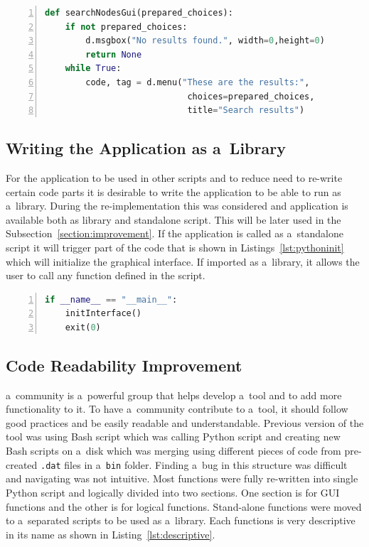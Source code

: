 {\noindent\begin{minipage}{\linewidth}
\begin{lstlisting}[language=Python, numbers=left, label={lst:removingresultlimit}, caption=Removing result limitation by passing choices as a~list argument., frame=single, showstringspaces=false, keywordstyle=\color{blue},captionpos=b]
def searchNodesGui(prepared_choices):
	if not prepared_choices:
		d.msgbox("No results found.", width=0,height=0)
		return None
	while True:
		code, tag = d.menu("These are the results:",
							choices=prepared_choices,
							title="Search results")
\end{lstlisting}
\end{minipage}

\subsection{Writing the Application as a~Library}
For the application to be used in other scripts and to reduce need to re-write certain code parts it is desirable to write the application to be able to run as a~library. During the re-implementation this was considered and application is available both as library and standalone script. This will be later used in the Subsection~\ref{section:improvement}. If the application is called as a~standalone script it will trigger part of the code that is shown in Listings~\ref{lst:pythoninit} which will initialize the graphical interface. If imported as a~library, it allows the user to call any function defined in the script.

{\noindent\begin{minipage}{\linewidth}
\begin{lstlisting}[language=Python, numbers=left, label={lst:pythoninit}, caption=Condition to recognize that application is being called as a~standalone script., frame=single, showstringspaces=false, breaklines=true, keywordstyle=\color{blue},captionpos=b]
if __name__ == "__main__":
	initInterface()
	exit(0)
\end{lstlisting}
\end{minipage}

\subsection{Code Readability Improvement}
\label{subsection:readability}
a~community is a~powerful group that helps develop a~tool and to add more functionality to it. To have a~community contribute to a~tool, it should follow good practices and be easily readable and understandable. Previous version of the tool was using Bash script which was calling Python script and creating new Bash scripts on a~disk which was merging using different pieces of code from pre-created \texttt{.dat} files in a~\texttt{bin} folder. Finding a~bug in this structure was difficult and navigating was not intuitive. Most functions were fully re-written into single Python script and logically divided into two sections. One section is for GUI functions and the other is for logical functions. Stand-alone functions were moved to a~separated scripts to be used as a~library. Each functions is very descriptive in its name as shown in Listing~\ref{lst:descriptive}.

}}
